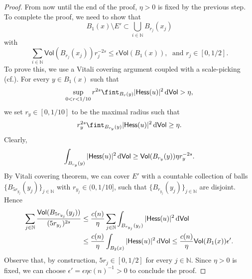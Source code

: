 \documentclass[10pt]{article}
\theoremstyle{definition}
\newcommand{\bb}[1]{\mathbb{#1}}
\newcommand{\ssf}[1]{\mathsf{#1}}
\newcommand{\Hess}{\mathsf{Hess}}
\newcommand{\de}{{\rm d}}
\begin{document}
\begin{proof}
            From now until the end of the proof, $\eta>0$ is fixed by the previous step. To complete the proof, we need to show that  
            \[
            B_1(x) \setminus E' \subset \bigcup_{i \in \bb{N}} B_{r_j}(x_j) 
            \]
            with
            \[
        \sum_{i \in \bb{N}} \ssf{Vol}(B_{r_j}(x_j)) r_j^{-2s} \leq \epsilon \ssf{Vol}(B_1(x)), \;  \text{ and } r_j \in [0,1/2].
        \]
        To prove this, we use a Vitali covering argument coupled with a scale-picking (cf.\;\cite{MonBruSem}). For every $y \in B_1(x)$ such that
        \[
        \sup_{0<r<1/10}r^{2s} \fint_{B_r(y)} |\Hess(u)|^2 \,\de\ssf{Vol} > \eta,
        \]
        we set $r_y \in [0,1/10]$ to be the maximal radius such that
        \[
        r_y^{2s}
        \fint_{B_{r_y}(y)} |\Hess(u)|^2 \,\de\ssf{Vol} \geq \eta.
        \]
        Clearly,
        \[
        \int_{B_{r_y}(y)} |\Hess(u)|^2 \,\de\ssf{Vol} \geq  \ssf{Vol}(B_{r_y}(y)) \eta r_y^{-2s}.
        \]
        By  Vitali covering theorem, we can cover $E'$ with a countable collection of balls $\{B_{5r_{y_j}}(y_j)\}_{j \in \bb{N}}$ with $r_{y_j} \in (0,1/10]$, such that $\{B_{r_{y_j}}(y_j)\}_{j \in \bb{N}}$ are disjoint. Hence
        \begin{align*}
        \sum_{j \in \bb{N}} \frac{\ssf{Vol}(B_{5r_{y_j}}(y_j))} {(5r_{y_j})^{2s}} 
        & \leq \frac{c(n)}{\eta}  \sum_{j \in \bb{N}} \int_{B_{r_{y_j}}(y_j)} |\Hess(u)|^2 \,\de\ssf{Vol} \\
        & \leq \frac{c(n)}{\eta} \int_{B_2(x)} |\Hess(u)|^2 \,\de\ssf{Vol} \leq  \frac{c(n)}{\eta} \ssf{Vol}(B_1(x))\epsilon'.
        \end{align*}
        Observe that, by construction, $5r_j \in [0,1/2]$ for every $j \in \bb{N}$. Since $\eta>0$ is fixed, we can choose $\epsilon'=\epsilon \eta c(n)^{-1}>0$ to conclude the proof. 
        \end{proof}
\end{document}
